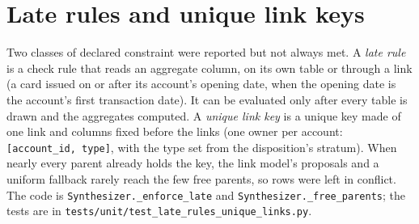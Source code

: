 \section{Late rules and unique link keys}\label{sec:v75latekeys}
\setcounter{savedproplatekeys}{\value{proposition}}
Two classes of declared constraint were reported but not always met. A \emph{late rule} is a check rule that reads an aggregate column, on its own table or through a link (a card issued on or after its account's opening date, when the opening date is the account's first transaction date). It can be evaluated only after every table is drawn and the aggregates computed. A \emph{unique link key} is a unique key made of one link and columns fixed before the links (one owner per account: \texttt{[account\_id, type]}, with the type set from the disposition's stratum). When nearly every parent already holds the key, the link model's proposals and a uniform fallback rarely reach the few free parents, so rows were left in conflict. The code is \texttt{Synthesizer.\_enforce\_late} and \texttt{Synthesizer.\_free\_parents}; the tests are in \texttt{tests/unit/test\_late\_rules\_unique\_links.py}.


